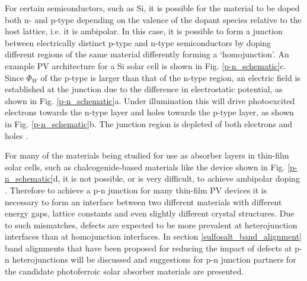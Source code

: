 \documentclass[11pt, twoside]{report}
\begin{document}
For certain semiconductors, such as Si, it is possible for the material to be doped both n- and p-type depending on the valence of the dopant species relative to the host lattice, i.e. it is ambipolar. In this case, it is possible to form a junction between electrically distinct p-type and n-type semiconductors by doping different regions of the same material differently forming a `homojunction'. An example PV architecture for a Si solar cell is shown in Fig. \ref{p-n_schematic}c. Since $\Phi_W$ of the p-type is larger than that of the n-type region, an electric field is established at the junction due to the difference in electrostatic potential, as shown in Fig. \ref{p-n_schematic}a. Under illumination this will drive photoexcited electrons towards the n-type layer and holes towards the p-type layer, as shown in Fig. \ref{p-n_schematic}b. The junction region is depleted of both electrons and holes \cite{Nelson5}.

For many of the materials being studied for use as absorber layers in thin-film solar cells, such as chalcogenide-based materials like the device shown in Fig. \ref{p-n_schematic}d, it is not possible, or is very difficult, to achieve ambipolar doping \cite{band_alignment_review, Zhang_doping_limits}. Therefore to achieve a p-n junction for many thin-film PV devices it is necessary to form an interface between two different materials with different energy gaps, lattice constants and even slightly different crystal structures. Due to such mismatches, defects are expected to be more prevalent at heterojunction interfaces than at homojunction interfaces. In section \ref{sulfosalt_band_alignment} band alignments that have been proposed for reducing the impact of defects at p-n heterojunctions will be discussed and suggestions for p-n junction partners for the candidate photoferroic solar absorber materials are presented.
\end{document}
